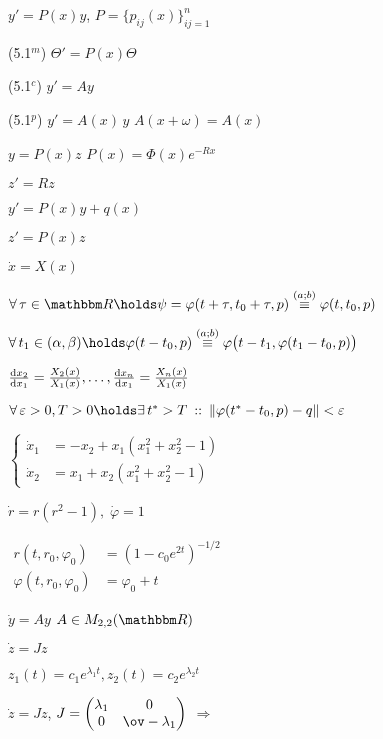 \documentclass[hardcopy]{longnotes}
\begin{document}
\begin{list}
  \item $y' = P(x) y$, $P = \{p_{ij}(x)\}_{ij=1}^n$ 
  \item[(5.1$^m$)] $\Theta' = P(x) \Theta$ 
  \item[(5.1$^c$)] $y' = A y$ 
  \item[(5.1$^p$)] $y' = A(x)\, y$ \hfill $A(x+\omega) = A(x)$
  \item $y = P(x) z$ \hfill $P(x) = \Phi(x) e^{-Rx}$
  \item $z' = Rz$
  \item $y' = P(x)y+q(x)$
  \item $z' = P(x) z$
    \nch
  \item $\dot x = X(x)$
  \item $\forall\, \tau \in \R \holds \psi=\varphi(t+ \tau, t_0 + \tau, p) 
    \overset{(a;b)}{\equiv} \varphi(t,t_0,p)$
  \item $\forall\, t_1 \in (\alpha,\beta)\holds \varphi (t-t_0,p) \overset{(a;b)}{\equiv} 
    \varphi\bigl(t-t_1, \varphi(t_1 - t_0, p)\bigr)$
  \item $\fder{x_2}{x_1} = \frac{X_2(x)}{X_1(x)}, \dotsc, \fder{x_n}{x_1} =\frac{X_n(x)}{X_1(x)}$
  \item $\forall\, \varepsilon > 0, T>0 \holds \exists\, t^* > T \that
    \|\varphi(t^*-t_0,p)-q\|<\varepsilon$ \hfill 
    \skeq
  \item $\left\{\begin{aligned}
      \dot x_1 &= -x_2 + x_1(x_1^2 + x_2^2 - 1) \\
      \dot x_2 &= x_1 + x_2(x_1^2 + x_2^2 - 1)  
    \end{aligned}\right.$
  \item $\dot r = r(r^2 -1),\; \dot \varphi =1$
  \item $
    \begin{aligned}
      r(t,r_0, \varphi_0) &= (1-c_0 e^{2t})^{-1/2}\\
      \varphi(t,r_0, \varphi_0) &= \varphi_0 + t
    \end{aligned}
    $
  \item $\dot y = Ay$ \hfill $A\in M_{2,2} (\R)$ \skeq
  \item $\dot z = J z$
  \item $z_1(t) = c_1 e^{\lambda_1t}, z_2(t) = c_2 e^{\lambda_2t}$
  \item $\dot z = J z$, 
    $J = 
    \begin{pmatrix}
      \lambda_1 & 0 \\ 0 & \ov-\lambda_1
    \end{pmatrix}$ $ \Rightarrow $

\end{list}
\end{document}
